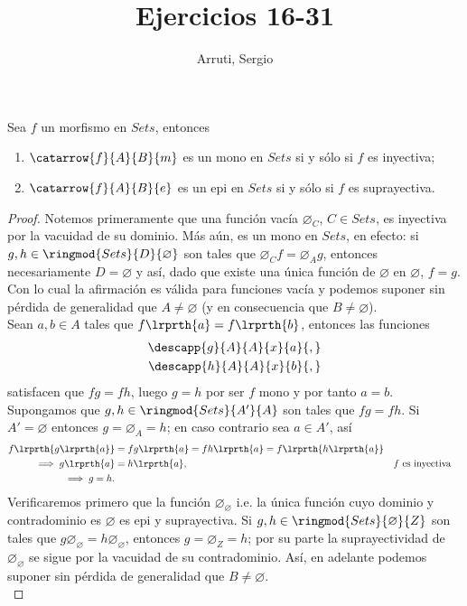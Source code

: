 \documentclass{article}
\title{Ejercicios 16-31}
\author{Arruti, Sergio}
\date{}
\begin{document}
	\maketitle
	\begin{lem}
		Sea $f$ un morfismo en $Sets$, entonces
		\begin{enumerate}[label=$\alph*)$]
			\item $\catarrow{f}{A}{B}{m}$ es un mono en $Sets$ si y sólo si $f$ es inyectiva;
			\item $\catarrow{f}{A}{B}{e}$ es un epi en $Sets$ si y sólo si $f$ es suprayectiva.
		\end{enumerate}
		\begin{proof}
			 Notemos primeramente que una función vacía $\varnothing_C$, $C\in Sets$, es inyectiva por la vacuidad de su dominio. Más aún, es un mono en $Sets$, en efecto: si $g,h\in\ringmod{Sets}{D}{\varnothing}$ son tales que $\varnothing_C f=\varnothing_A g$, entonces necesariamente $D=\varnothing$ y así, dado que existe una única función de $\varnothing$ en $\varnothing$, $f=g$. Con lo cual la afirmación es válida para funciones vacía y podemos suponer sin pérdida de generalidad que $A\neq\varnothing$ (y en consecuencia que $B\neq\varnothing$).\\
			 Sean $a,b\in A$ tales que $f\lrprth{a}=f\lrprth{b}$, entonces las funciones
			\begin{align*}
				\descapp{g}{A}{A}{x}{a}{,}\\
				\descapp{h}{A}{A}{x}{b}{,}
			\end{align*}
			satisfacen que $fg=fh$, luego $g=h$ por  ser $f$ mono y por tanto $a=b$.\\
			 Supongamos que  $g,h\in\ringmod{Sets}{A'}{A}$ son tales que $fg=fh$. Si $A'=\varnothing$ entonces $g=\varnothing_A=h$; en caso contrario sea $a\in A'$, así
			\begin{align*}
				f\lrprth{g\lrprth{a}}&=fg\lrprth{a}=fh\lrprth{a}=f\lrprth{h\lrprth{a}}\\
				\implies g\lrprth{a}&=h\lrprth{a}, && f\text{ es inyectiva}\\
				\implies g=h.
			\end{align*}
			 Verificaremos primero que la función $\varnothing_\varnothing$ i.e. la única función cuyo dominio y contradominio es $\varnothing$ es epi y suprayectiva. Si  $g,h\in\ringmod{Sets}{\varnothing}{Z}$ son tales que $g\varnothing_\varnothing=h\varnothing_\varnothing$, entonces $g=\varnothing_Z=h$; por su parte la suprayectividad de $\varnothing_\varnothing$ se sigue por la vacuidad de su contradominio. Así, en adelante podemos suponer sin pérdida de generalidad que $B\neq\varnothing$.\\

\end{proof}
\end{lem}
\end{document}

